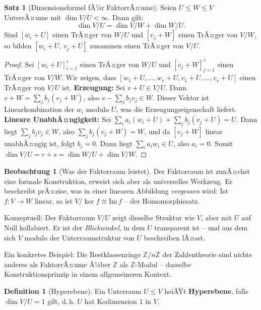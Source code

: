 ﻿\documentclass[a4paper,12pt]{report}
\theoremstyle{definition}
\newtheorem{definition}{Definition}
\newtheorem{satz}{Satz}
\newtheorem{beobachtung}{Beobachtung}
\begin{document}
\begin{satz}[Dimensionsformel fÃ¼r FaktorrÃ¤ume]
    Seien $U \leq W \leq V$ UnterrÃ¤ume mit $\dim V/U < \infty$. Dann gilt:
    \[
        \dim V/U = \dim V/W + \dim W/U.
    \]
    Sind $[w_i + U]$ einen TrÃ¤ger von $W/U$ und $[v_j + W]$ einen TrÃ¤ger
    von $V/W$, so bilden $[w_i + U,\, v_j + U]$ zusammen einen TrÃ¤ger
    von $V/U$.
\end{satz}
\begin{proof}
    Sei $[w_i + U]_{i=1}^r$ einen TrÃ¤ger von $W/U$ und $[v_j + W]_{j=1}^s$
    einen TrÃ¤ger von $V/W$. Wir zeigen, dass $[w_1 + U, \ldots, w_r + U,
    v_1 + U, \ldots, v_s + U]$ einen TrÃ¤ger von $V/U$ ist.
    \textbf{Erzeugung:} Sei $v + U \in V/U$. Dann $v + W = \sum_j b_j(v_j + W)$,
    also $v - \sum_j b_j v_j \in W$. Dieser Vektor ist Linearkombination
    der $w_i$ modulo $U$, was die Erzeugungseigenschaft liefert.
    \textbf{Lineare UnabhÃ¤ngigkeit:} Sei $\sum_i a_i(w_i + U) + \sum_j b_j(v_j + U) = U$.
    Dann liegt $\sum_j b_j v_j \in W$, also $\sum_j b_j(v_j + W) = W$, und
    da $[v_j + W]$ linear unabhÃ¤ngig ist, folgt $b_j = 0$. Dann liegt
    $\sum_i a_i w_i \in U$, also $a_i = 0$.
    Somit $\dim V/U = r + s = \dim W/U + \dim V/W$.
\end{proof}


\begin{beobachtung}[Was der Faktorraum leistet]
    Der Faktorraum ist zunÃ¤chst eine formale Konstruktion, erweist sich
    aber als universelles Werkzeug. Er beschreibt prÃ¤zise, was in einer
    linearen Abbildung \emph{vergessen} wird: Ist $f : V \to W$ linear,
    so ist $V/\ker f \cong \mathrm{Im}\, f$ -- der Homomorphiesatz.

    Konzeptuell: Der Faktorraum $V/U$ zeigt dieselbe Struktur wie $V$,
    aber mit $U$ auf Null kollabiert. Er ist der \emph{Blickwinkel}, in dem
    $U$ transparent ist -- und aus dem sich $V$ modulo der Unterraumstruktur
    von $U$ beschreiben lÃ¤sst.

    Ein konkretes Beispiel: Die Restklassenringe $\mathbb{Z}/n\mathbb{Z}$
    der Zahlentheorie sind nichts anderes als FaktorrÃ¤ume Ã¼ber $\mathbb{Z}$
    als $\mathbb{Z}$-Modul -- dasselbe Konstruktionsprinzip in einem
    allgemeineren Kontext.
\end{beobachtung}

\begin{definition}[Hyperebene]
    Ein Unterraum $U \leq V$ heiÃŸt \textbf{Hyperebene}, falls
    $\dim V/U = 1$ gilt, d.\,h. $U$ hat Kodimension $1$ in $V$.
\end{definition}
\end{document}
